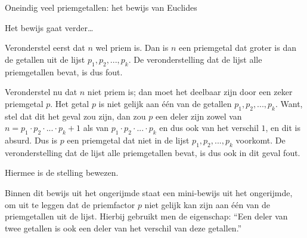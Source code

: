 \begin{lesactiviteit}{Oneindig veel priemgetallen: het bewijs van Euclides}
\begin{vraagenantwoord}[resume]




    
\end{vraagenantwoord}

Het bewijs gaat verder\ldots\\

\begin{kader}{}{}

Veronderstel eerst dat $n$ wel priem is. Dan is $n$ een priemgetal dat groter is dan de getallen uit de lijst $p_1, p_2, ..., p_k$. De veronderstelling dat de lijst alle priemgetallen bevat, is dus fout.

Veronderstel nu dat $n$ niet priem is; dan  moet het deelbaar zijn door een zeker priemgetal $p$. Het getal $p$ is niet gelijk aan één van de getallen $p_1, p_2, ..., p_k$. Want, stel dat dit het geval zou zijn, dan zou $p$ een deler zijn zowel van $n=p_1\cdot p_2\cdot ...\cdot p_k+1$ als van $p_1\cdot p_2\cdot ...\cdot p_k$ en dus ook van het verschil $1$, en dit is absurd. Dus is $p$ een priemgetal dat niet in de lijst $p_1, p_2, ..., p_k$ voorkomt. De veronderstelling dat de lijst alle priemgetallen bevat, is dus ook in dit geval fout.

Hiermee is de stelling bewezen.

\end{kader}

\begin{vraagenantwoord}[resume]



\end{vraagenantwoord}

Binnen dit bewijs uit het ongerijmde staat een mini-bewijs uit het ongerijmde, om uit te leggen dat de priemfactor $p$ niet gelijk kan zijn aan één van de priemgetallen uit de lijst. Hierbij gebruikt men de eigenschap: ``Een deler van twee getallen is ook een deler van het verschil van deze getallen.''


\end{lesactiviteit}
